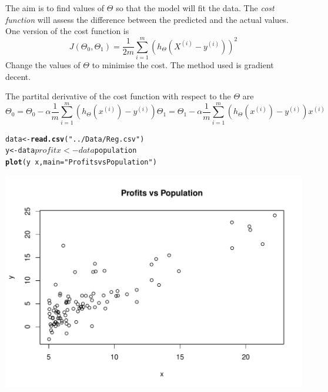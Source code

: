 \documentclass[12pt, a4paper, oneside]{article}\usepackage{graphicx, color}
\makeatletter
\def\maxwidth{ %
  \ifdim\Gin@nat@width>\linewidth
    \linewidth
  \else
    \Gin@nat@width
  \fi
}
\newcommand{\hlfunctioncall}[1]{\textcolor[rgb]{0.501960784313725,0,0.329411764705882}{\textbf{#1}}}%
\newcommand{\hlstring}[1]{\textcolor[rgb]{0.6,0.6,1}{#1}}%
\newenvironment{kframe}{%
 \def\at@end@of@kframe{}%
 \ifinner\ifhmode%
  \def\at@end@of@kframe{\end{minipage}}%
  \begin{minipage}{\columnwidth}%
 \fi\fi%
 \def\FrameCommand##1{\hskip\@totalleftmargin \hskip-\fboxsep
 \colorbox{shadecolor}{##1}\hskip-\fboxsep
     \hskip-\linewidth \hskip-\@totalleftmargin \hskip\columnwidth}%
 \MakeFramed {\advance\hsize-\width
   \@totalleftmargin\z@ \linewidth\hsize
   \@setminipage}}%
 {\par\unskip\endMakeFramed%
 \at@end@of@kframe}
\newenvironment{knitrout}{}{} %
\makeatother
\begin{document}
The aim is to find values of $\Theta$ so that the model will fit the data.  The \emph{cost function} will assess the difference between the predicted and the actual values. One version of the cost function is 
\begin{equation}
J(\Theta_0, \Theta_1) = \frac{1}{2m} \sum_{i=1}^m (h_{\Theta}(X^{(i)} - y^{(i)}))^2
\end{equation}
Change the values of $\Theta$ to minimise the cost. The method used is gradient decent. 

The partital derivative of the cost function with respect to the $\Theta$ are
\begin{subequations}
\begin{equation}
\Theta_0 = \Theta_0 - \alpha \frac{1}{m}\sum_{i=1}^m (h_{\Theta}(x^{(i)}) - y^{(i)})
\end{equation}
\begin{equation}
\Theta_1 = \Theta_1 - \alpha \frac{1}{m}\sum_{i=1}^m (h_{\Theta}(x^{(i)}) - y^{(i)})x^{(i)}
\end{equation}
\end{subequations}

\begin{knitrout}
\color{fgcolor}\begin{kframe}
\begin{alltt}
data <- \hlfunctioncall{read.csv}(\hlstring{"../Data/Reg.csv"})
y <- data$profit
x <- data$population
\hlfunctioncall{plot}(y ~ x, main = \hlstring{"Profits vs Population"})
\end{alltt}
\end{kframe}
\includegraphics[width=\maxwidth]{figure/Regression} 

\end{knitrout}
\end{document}
